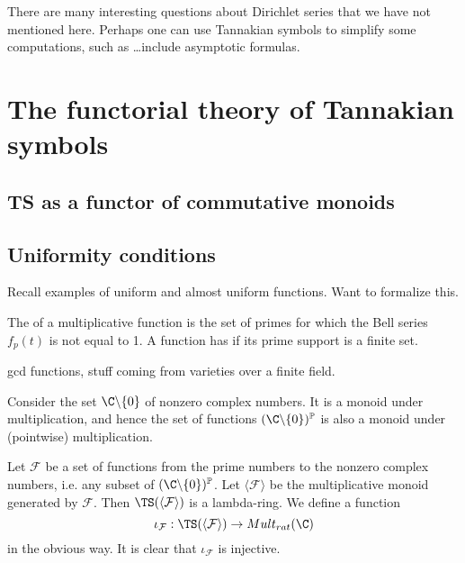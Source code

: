 \documentclass[a4paper]{article}
\begin{document}
\begin{remark}
There are many interesting questions about Dirichlet series that we have not mentioned here. Perhaps one can use Tannakian symbols to simplify some computations, such as \ldots include asymptotic formulas.
\end{remark}


\section{The functorial theory of Tannakian symbols}


\subsection{\textbf{TS} as a functor of commutative monoids}

\subsection{Uniformity conditions}
Recall examples of uniform and almost uniform functions. Want to formalize this.

\begin{definition}
The  of a multiplicative function is the set of primes for which the Bell series $f_p(t)$ is not equal to 1. A function has  if its prime support is a finite set. 
\end{definition}

\begin{example}
gcd functions, stuff coming from varieties over a finite field.
\end{example}

Consider the set $\C \backslash \{ 0\}$ of nonzero complex numbers. It is a monoid under multiplication, and hence the set of functions $(\C \backslash \{ 0 \})^{\mathbb{P}}$ is also a monoid under (pointwise) multiplication.

Let $\mathcal{F}$ be a set of functions from the prime numbers to the nonzero complex numbers, i.e. any subset of $(\C \backslash \{ 0 \})^{\mathbb{P}}$. Let $\langle \mathcal{F} \rangle$ be the multiplicative monoid generated by $\mathcal{F}$. Then $\TS(\langle \mathcal{F} \rangle)$ is a lambda-ring. We define a function
$$ \iota_{\mathcal{F}} : \TS(\langle \mathcal{F} \rangle) \to Mult_{rat}(\C)  $$
in the obvious way. It is clear that $\iota_{\mathcal{F}}$ is injective.
\end{document}
